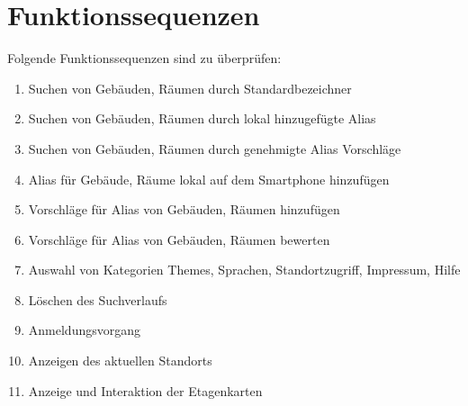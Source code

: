 \section{Funktionssequenzen}

Folgende Funktionssequenzen sind zu überprüfen:
\begin{enumerate}[label=\textbf{/T\arabic*0/}, align=left]
	\item Suchen von Gebäuden, Räumen durch Standardbezeichner
	\item Suchen von Gebäuden, Räumen durch lokal hinzugefügte Alias
	\item Suchen von Gebäuden, Räumen durch genehmigte Alias Vorschläge
	\item Alias für Gebäude, Räume lokal auf dem Smartphone hinzufügen
	\item Vorschläge für Alias von Gebäuden, Räumen hinzufügen
	\item Vorschläge für Alias von Gebäuden, Räumen bewerten
	\item Auswahl von Kategorien Themes, Sprachen, Standortzugriff, Impressum, Hilfe
	\item Löschen des Suchverlaufs
	\item Anmeldungsvorgang
	\item Anzeigen des aktuellen Standorts
	\item Anzeige und Interaktion der Etagenkarten

\end{enumerate}
